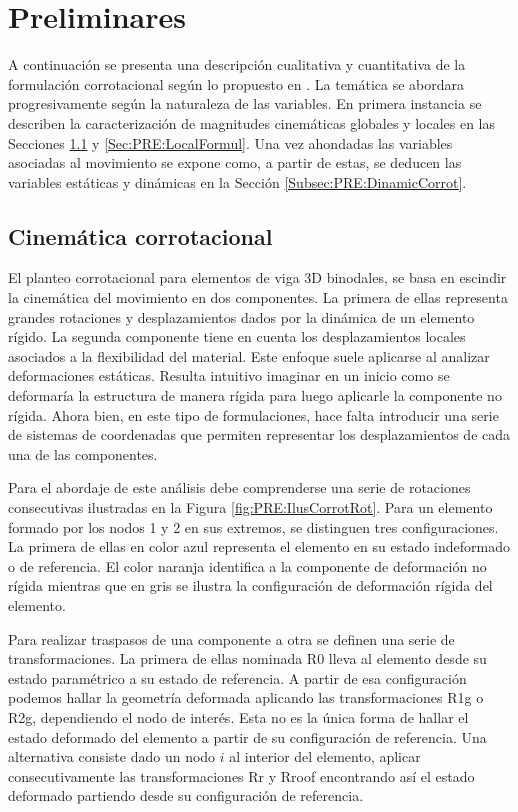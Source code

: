 \chapter{Preliminares}\label{Cap:Preliminares}
\linenumbers

A continuación se presenta una descripción cualitativa y cuantitativa de la formulación corrotacional según lo propuesto en \citep{Le2014}. La temática se abordara progresivamente según la naturaleza de las variables. En primera instancia se describen la caracterización de magnitudes cinemáticas globales y locales en las Secciones \ref{Subsec:PRE:CienmaticCorrot} y \ref{Sec:PRE:LocalFormul}. Una vez ahondadas las variables asociadas al movimiento se expone como, a partir de estas, se deducen las variables estáticas y dinámicas en la Sección \ref{Subsec:PRE:DinamicCorrot}.


\section{Cinemática corrotacional}\label{Subsec:PRE:CienmaticCorrot}

El planteo corrotacional para elementos de viga 3D binodales, se basa en escindir la cinemática del movimiento en dos componentes. La primera de ellas representa grandes rotaciones y desplazamientos dados por la dinámica de un elemento rígido. La segunda componente tiene en cuenta los desplazamientos locales asociados a la flexibilidad del material. Este enfoque suele aplicarse al analizar deformaciones estáticas. Resulta intuitivo imaginar en un inicio como se deformaría la estructura de manera rígida para luego aplicarle la componente no rígida. Ahora bien, en este tipo de formulaciones, hace falta introducir una serie de sistemas de coordenadas que permiten representar los desplazamientos de cada una de las componentes.

Para el abordaje de este análisis debe comprenderse una serie de rotaciones consecutivas ilustradas en la Figura \ref{fig:PRE:IlusCorrotRot}. Para un elemento formado por los nodos 1 y 2 en sus extremos, se distinguen tres configuraciones. La primera de ellas en color azul representa el elemento en su estado indeformado o de referencia. El color naranja identifica a la componente de deformación no rígida mientras que en gris se ilustra la configuración de deformación rígida del elemento.

Para realizar traspasos de una componente a otra se definen una serie de transformaciones. La primera de ellas nominada \gls{R0} lleva al elemento desde su estado paramétrico a su estado de referencia. A partir de esa configuración podemos hallar la geometría deformada aplicando las transformaciones \gls{R1g} o \gls{R2g}, dependiendo el nodo de interés. Esta no es la única forma de hallar el estado deformado del elemento a partir de su configuración de referencia. Una alternativa consiste dado un nodo $i$ al interior del elemento, aplicar consecutivamente las transformaciones \gls{Rr} y \gls{Rroof} encontrando así el estado deformado partiendo desde su configuración de referencia.

